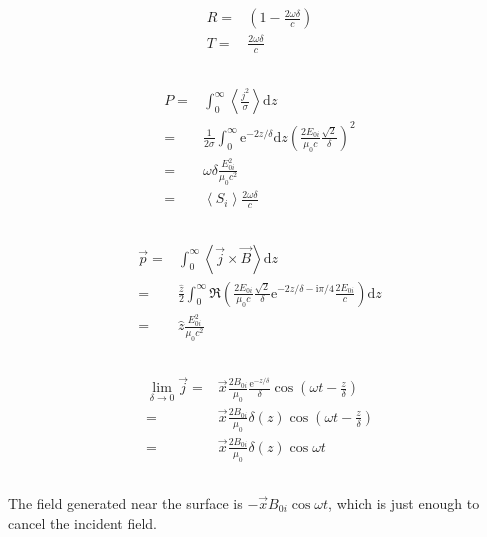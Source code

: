 \documentclass[10pt,fleqn]{article}
\newcommand{\ud}{\mathrm{d}}
\newcommand{\ue}{\mathrm{e}}
\newcommand{\ui}{\mathrm{i}}
\newcommand{\eqar}[1]
{
  \begin{align*}
    #1
  \end{align*}
}
\newcommand{\paren}[1]{{\left({#1}\right)}}
\newcommand{\angl}[1]{{\left\langle{#1}\right\rangle}}
\begin{document}
\subsection{}
\eqar{
  R=&\paren{1-\frac{2\omega\delta}{c}}\\
  T=&\frac{2\omega\delta}{c}
}
\subsection{}
\eqar{
  P=&\int_0^\infty\angl{\frac{j^2}{\sigma}}\ud z\\
  =&\frac{1}{2\sigma}\int_0^\infty\ue^{-2z/\delta}\ud z
  \paren{\frac{2E_{0i}}{\mu_0c}\frac{\sqrt2}{\delta}}^2\\
  =&\omega\delta\frac{E_{0i}^2}{\mu_0c^2}\\
  =&\angl{S_i}\frac{2\omega\delta}{c}
}
\subsection{}
\eqar{
  \vec p=&\int_0^\infty\angl{\vec j\times\vec B}\ud z\\
  =&\frac{\hat z}2\int_0^\infty\Re\paren{\frac{2E_{0i}}{\mu_0c}\frac{\sqrt2}{\delta}
    \ue^{-2z/\delta-\ui\pi/4}
    \frac{2E_{0i}}{c}}\ud z\\
  =&\hat z\frac{E_{0i}^2}{\mu_0 c^2}
}
\subsection{}
\eqar{
  \lim_{\delta\rightarrow0}\vec j=&\vec x\frac{2B_{0i}}{\mu_0}\frac{\ue^{-z/\delta}}{\delta}\cos\paren{\omega t-\frac{z}{\delta}}\\
  =&\vec x\frac{2B_{0i}}{\mu_0}\delta\paren{z}\cos\paren{\omega t-\frac{z}{\delta}}\\
  =&\vec x\frac{2B_{0i}}{\mu_0}\delta\paren{z}\cos{\omega t}
}
\subsection{}
The field generated near the surface is $-\vec xB_{0i}\cos{\omega t}$, which is just enough to cancel the incident field.

\section{}
\subsection{}
\subsection{}
\subsection{}
\subsection{}
\subsection{}
\subsection{}

\section{}
\end{document}
